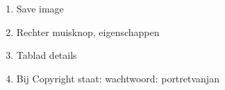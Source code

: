 \begin{enumerate}
  \item Save image
  \item Rechter muisknop, eigenschappen
  \item Tablad details
  \item Bij Copyright staat: wachtwoord: portretvanjan
\end{enumerate}